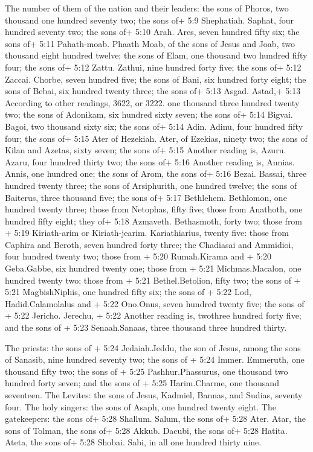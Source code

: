  The number of them of the nation and their leaders: the
sons of Phoros, two thousand one hundred seventy two; the sons of+ 5:9
Shephatiah. Saphat, four hundred seventy two;  the sons of+
5:10 Arah. Ares, seven hundred fifty six;  the sons of+
5:11 Pahath-moab. Phaath Moab, of the sons of Jesus and Joab, two
thousand eight hundred twelve;  the sons of Elam, one
thousand two hundred fifty four; the sons of+ 5:12 Zattu. Zathui, nine
hundred forty five; the sons of+ 5:12 Zaccai. Chorbe, seven hundred
five; the sons of Bani, six hundred forty eight;  the sons
of Bebai, six hundred twenty three; the sons of+ 5:13 Asgad. Astad,+
5:13 According to other readings, 3622, or 3222. one thousand three
hundred twenty two;  the sons of Adonikam, six hundred
sixty seven; the sons of+ 5:14 Bigvai. Bagoi, two thousand sixty six;
the sons of+ 5:14 Adin. Adinu, four hundred fifty four; 
the sons of+ 5:15 Ater of Hezekiah. Ater, of Ezekias, ninety two; the
sons of Kilan and Azetas, sixty seven; the sons of+ 5:15 Another reading
is, Azuru. Azaru, four hundred thirty two;  the sons of+
5:16 Another reading is, Annias. Annis, one hundred one; the sons of
Arom, the sons of+ 5:16 Bezai. Bassai, three hundred twenty three; the
sons of Arsiphurith, one hundred twelve;  the sons of
Baiterus, three thousand five; the sons of+ 5:17 Bethlehem. Bethlomon,
one hundred twenty three;  those from Netophas, fifty five;
those from Anathoth, one hundred fifty eight; they of+ 5:18 Azmaveth.
Bethasmoth, forty two;  those from + 5:19 Kiriath-arim or
Kiriath-jearim. Kariathiarius, twenty five: those from Caphira and
Beroth, seven hundred forty three;  the Chadiasai and
Ammidioi, four hundred twenty two; those from + 5:20 Rumah.Kirama and +
5:20 Geba.Gabbe, six hundred twenty one;  those from + 5:21
Michmas.Macalon, one hundred twenty two; those from + 5:21
Bethel.Betolion, fifty two; the sons of + 5:21 MagbishNiphis, one
hundred fifty six;  the sons of + 5:22 Lod,
Hadid.Calamolalus and + 5:22 Ono.Onus, seven hundred twenty five; the
sons of + 5:22 Jericho. Jerechu, + 5:22 Another reading is, twothree
hundred forty five;  and the sons of + 5:23 Senaah.Sanaas,
three thousand three hundred thirty.

 The priests: the sons of + 5:24 Jedaiah.Jeddu, the son of
Jesus, among the sons of Sanasib, nine hundred seventy two; the sons of
+ 5:24 Immer. Emmeruth, one thousand fifty two;  the sons
of + 5:25 Pashhur.Phassurus, one thousand two hundred forty seven; and
the sons of + 5:25 Harim.Charme, one thousand seventeen. 
The Levites: the sons of Jesus, Kadmiel, Bannas, and Sudias, seventy
four.  The holy singers: the sons of Asaph, one hundred
twenty eight.  The gatekeepers: the sons of+ 5:28 Shallum.
Salum, the sons of+ 5:28 Ater. Atar, the sons of Tolman, the sons of+
5:28 Akkub. Dacubi, the sons of+ 5:28 Hatita. Ateta, the sons of+ 5:28
Shobai. Sabi, in all one hundred thirty nine.

